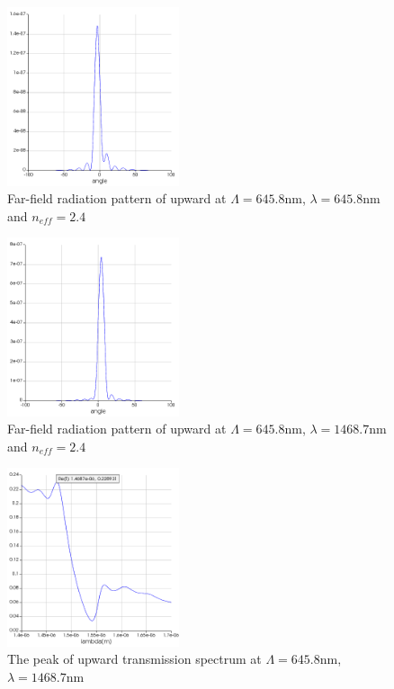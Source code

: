 \documentclass[fontsize=11pt]{scrartcl}
\begin{document}
\subsection{}
\begin{figure}[H]
    \centering
     \includegraphics[width=0.45\textwidth]{img/fig3.3.png}
     \caption{Far-field radiation pattern of upward at $\Lambda=645.8\mathrm{nm}$,
     $\lambda=645.8\mathrm{nm}$ and $n_{eff}=2.4$}
     \label{fig3.3}
\end{figure}
\begin{figure}[H]
    \centering
     \includegraphics[width=0.45\textwidth]{img/fig3.4.png}
     \caption{Far-field radiation pattern of upward at $\Lambda=645.8\mathrm{nm}$,
     $\lambda=1468.7\mathrm{nm}$ and $n_{eff}=2.4$}
     \label{fig3.4}
\end{figure}
\begin{figure}[H]
    \centering
     \includegraphics[width=0.45\textwidth]{img/fig3.5.png}
     \caption{The peak of upward transmission spectrum at $\Lambda=645.8\mathrm{nm}$,
     $\lambda=1468.7\mathrm{nm}$}
     \label{fig3.5}
\end{figure}
\end{document}
